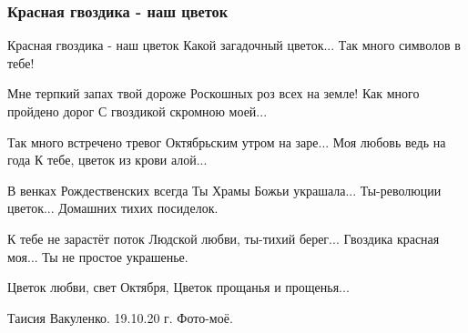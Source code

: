  
 
 

\subsubsection{Красная гвоздика - наш цветок}
\label{sec:poetry.rus.taisia_vakulenko.krasnaja_gvozdika}

Красная гвоздика - наш цветок
Какой загадочный цветок...
Так много символов в тебе!

Мне терпкий запах твой дороже
Роскошных роз всех на земле!
Как много пройдено дорог
С гвоздикой скромною моей...

Так много встречено тревог
Октябрьским утром на заре...
Моя любовь ведь на года
К тебе, цветок из крови алой...

В венках Рождественских всегда
Ты Храмы Божьи украшала...
Ты-революции цветок...
Домашних тихих посиделок.

К тебе не зарастёт поток
Людской любви, ты-тихий берег...
Гвоздика красная моя...
Ты не простое украшенье.

Цветок любви, свет Октября,
Цветок прощанья и прощенья...

Таисия Вакуленко. 
19.10.20 г.
Фото-моё.
